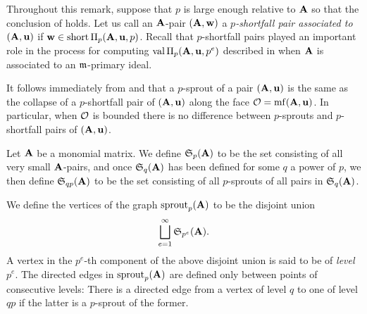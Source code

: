 \documentclass{amsart}
\begin{document}
\begin{remark}
   \label{sprouts as collapsed shortfall pairs: R}
   Throughout this remark, suppose that $p$ is large enough relative to $\mathbf{A}$ so that the conclusion of  holds.
   Let us call an $\mathbf{A}$-pair $(\mathbf{A},\mathbf{w})$ a \emph{$p$-shortfall pair associated to $(\mathbf{A},\mathbf{u})$} if $\mathbf{w} \in \operatorname{short} \Pi_p(\mathbf{A},\mathbf{u},p)$.
   Recall that $p$-shortfall pairs played an important role in the process for computing $\operatorname{val} \Pi_p(\mathbf{A},\mathbf{u},p^e)$ described in  when $\mathbf{A}$ is associated to an $\mathfrak{m}$-primary ideal.

   It follows immediately from  and  that a $p$-sprout of a pair $(\mathbf{A},\mathbf{u})$ is the same as the collapse of a $p$-shortfall pair of $(\mathbf{A},\mathbf{u})$ along the face $\mathcal{O}=\operatorname{mf}(\mathbf{A},\mathbf{u})$.  In particular, when $\mathcal{O}$ is bounded there is no difference between $p$-sprouts and $p$-shortfall pairs of $(\mathbf{A},\mathbf{u})$.
\end{remark}

\begin{definition}
   Let $\mathbf{A}$ be a monomial matrix.
   We define $\mathfrak{S}_p(\mathbf{A})$ to be the set consisting of all very small $\mathbf{A}$-pairs, and once $\mathfrak{S}_q(\mathbf{A})$ has been defined for some $q$ a power of $p$, we then define $\mathfrak{S}_{qp}(\mathbf{A})$ to be the set consisting of all $p$-sprouts of all pairs in $\mathfrak{S}_q(\mathbf{A})$.

   We define the vertices of the graph $\operatorname{sprout}_p(\mathbf{A})$ to be the disjoint union
   \[ \bigsqcup_{e=1}^{\infty} \mathfrak{S}_{p^e}(\mathbf{A}). \]
   A vertex in the $p^e$-th component of the above disjoint union is said to be of \emph{level} $p^e$.
   The directed edges in $\operatorname{sprout}_p(\mathbf{A})$ are defined only between points of consecutive levels:
   There is a directed edge from a vertex of level $q$ to one of level $qp$ if the latter is a $p$-sprout of the former.
\end{definition}
\end{document}
